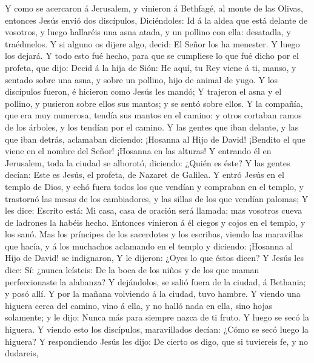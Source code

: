  Y como se acercaron á Jerusalem, y vinieron á Bethfagé,
al monte de las Olivas, entonces Jesús envió dos discípulos,
 Diciéndoles: Id á la aldea que está delante de vosotros,
y luego hallaréis una asna atada, y un pollino con ella: desatadla, y
traédmelos.  Y si alguno os dijere algo, decid: El Señor
los ha menester. Y luego los dejará.  Y todo esto fué
hecho, para que se cumpliese lo que fué dicho por el profeta, que dijo:
 Decid á la hija de Sión: He aquí, tu Rey viene á ti,
manso, y sentado sobre una asna, y sobre un pollino, hijo de animal de
yugo.  Y los discípulos fueron, é hicieron como Jesús les
mandó;  Y trajeron el asna y el pollino, y pusieron sobre
ellos sus mantos; y se sentó sobre ellos.  Y la compañía,
que era muy numerosa, tendía sus mantos en el camino: y otros cortaban
ramos de los árboles, y los tendían por el camino.  Y las
gentes que iban delante, y las que iban detrás, aclamaban diciendo:
¡Hosanna al Hijo de David! ¡Bendito el que viene en el nombre del Señor!
¡Hosanna en las alturas!  Y entrando él en Jerusalem,
toda la ciudad se alborotó, diciendo: ¿Quién es éste?  Y
las gentes decían: Este es Jesús, el profeta, de Nazaret de Galilea.
 Y entró Jesús en el templo de Dios, y echó fuera todos
los que vendían y compraban en el templo, y trastornó las mesas de los
cambiadores, y las sillas de los que vendían palomas;  Y
les dice: Escrito está: Mi casa, casa de oración será llamada; mas
vosotros cueva de ladrones la habéis hecho.  Entonces
vinieron á él ciegos y cojos en el templo, y los sanó. 
Mas los príncipes de los sacerdotes y los escribas, viendo las
maravillas que hacía, y á los muchachos aclamando en el templo y
diciendo: ¡Hosanna al Hijo de David! se indignaron,  Y le
dijeron: ¿Oyes lo que éstos dicen? Y Jesús les dice: Sí: ¿nunca
leísteis: De la boca de los niños y de los que maman perfeccionaste la
alabanza?  Y dejándolos, se salió fuera de la ciudad, á
Bethania; y posó allí.  Y por la mañana volviendo á la
ciudad, tuvo hambre.  Y viendo una higuera cerca del
camino, vino á ella, y no halló nada en ella, sino hojas solamente; y le
dijo: Nunca más para siempre nazca de ti fruto. Y luego se secó la
higuera.  Y viendo esto los discípulos, maravillados
decían: ¿Cómo se secó luego la higuera?  Y respondiendo
Jesús les dijo: De cierto os digo, que si tuviereis fe, y no dudareis,
